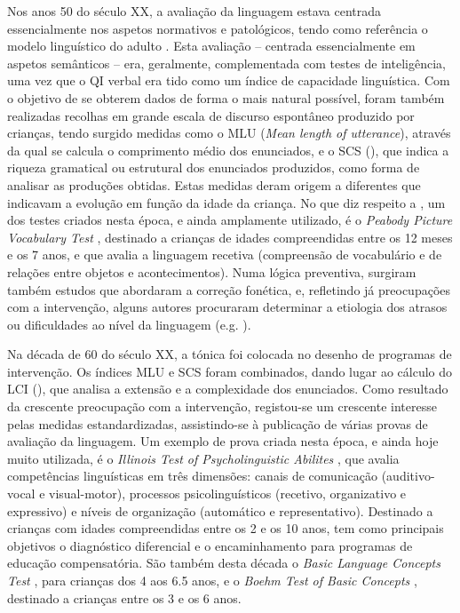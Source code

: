 \documentclass[output=paper]{LSP/langsci}
\begin{document}
Nos anos 50 do século XX, a avaliação da linguagem estava centrada essencialmente nos aspetos normativos e patológicos, tendo como referência o modelo linguístico do adulto \citep{launerlahey1981}. Esta avaliação – centrada essencialmente em aspetos semânticos – era, geralmente, complementada com testes de inteligência, uma vez que o QI verbal era tido como um índice de capacidade linguística. Com o objetivo de se obterem dados de forma o mais natural possível, foram também realizadas recolhas em grande escala de discurso espontâneo produzido por crianças, tendo surgido medidas como o MLU (\textit{Mean length of utterance}), através da qual se calcula o comprimento médio dos enunciados, e o SCS (\textit{}), que indica a riqueza gramatical ou estrutural dos enunciados produzidos, como forma de analisar as produções obtidas. Estas medidas deram origem a diferentes  que indicavam a evolução em função da idade da criança. No que diz respeito a , um dos testes criados nesta época, e ainda amplamente utilizado, é o \textit{Peabody Picture Vocabulary Test} \citep{dunndunn1959}, destinado a crianças de idades compreendidas entre os 12 meses e os 7 anos, e que avalia a linguagem recetiva (compreensão de vocabulário e de relações entre objetos e acontecimentos). Numa lógica preventiva, surgiram também estudos que abordaram a correção fonética, e, refletindo já preocupações com a intervenção, alguns autores procuraram determinar a etiologia dos atrasos ou dificuldades ao nível da linguagem (e.g. \citealt{myklebust1954}).

Na década de 60 do século XX, a tónica foi colocada no desenho de programas de intervenção. Os índices MLU e SCS foram combinados, dando lugar ao cálculo do LCI (\textit{}), que analisa a extensão e a complexidade dos enunciados. Como resultado da crescente preocupação com a intervenção, registou-se um crescente interesse pelas medidas estandardizadas, assistindo-se à publicação de várias provas de avaliação da linguagem. Um exemplo de prova criada nesta época, e ainda hoje muito utilizada, é o \textit{Illinois Test of Psycholinguistic Abilites} \citep{kirk_etal1961}, que avalia competências linguísticas em três dimensões: canais de comunicação (auditivo-vocal e visual-motor), processos psicolinguísticos (recetivo, organizativo e expressivo) e níveis de organização (automático e representativo). Destinado a crianças com idades compreendidas entre os 2 e os 10 anos, tem como principais objetivos o diagnóstico diferencial e o encaminhamento para programas de educação compensatória. São também desta década o \textit{Basic Language Concepts Test} \citep{engelmann_etal1966}, para crianças dos 4 aos 6.5 anos, e o \textit{Boehm Test of Basic Concepts} \citep{boehm1967}, destinado a crianças entre os 3 e os 6 anos.
\end{document}
